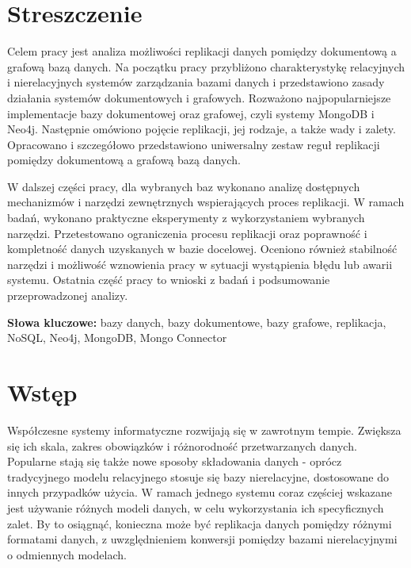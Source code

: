 \documentclass[a4paper,twoside,12pt]{book}
\newcounter{stronyPozaNumeracja}
\begin{document}
\pagestyle{tylkoNumeryStron}
\tableofcontents

\setcounter{stronyPozaNumeracja}{\value{page}}
\mainmatter

\pagestyle{empty}

\chapter*{Streszczenie}

Celem pracy jest analiza możliwości replikacji danych pomiędzy dokumentową a grafową bazą danych. Na początku pracy przybliżono charakterystykę relacyjnych i nierelacyjnych systemów zarządzania bazami danych i przedstawiono zasady działania systemów dokumentowych i grafowych. Rozważono najpopularniejsze implementacje bazy dokumentowej oraz grafowej, czyli systemy MongoDB i Neo4j. Następnie omówiono pojęcie replikacji, jej rodzaje, a także wady i zalety. Opracowano i szczegółowo przedstawiono uniwersalny zestaw reguł replikacji pomiędzy dokumentową a grafową bazą danych.

W dalszej części pracy, dla wybranych baz wykonano analizę dostępnych mechanizmów i narzędzi zewnętrznych wspierających proces replikacji. W ramach badań, wykonano praktyczne eksperymenty z wykorzystaniem wybranych narzędzi. Przetestowano ograniczenia procesu replikacji oraz poprawność i kompletność danych uzyskanych w bazie docelowej. Oceniono również stabilność narzędzi i możliwość wznowienia pracy w sytuacji wystąpienia błędu lub awarii systemu. Ostatnia część pracy to wnioski z badań i podsumowanie przeprowadzonej analizy.

{\bf Słowa kluczowe:} bazy danych, bazy dokumentowe, bazy grafowe, replikacja, NoSQL, Neo4j, MongoDB, Mongo Connector


\cleardoublepage

\pagestyle{NumeryStronNazwyRozdzialow}


\chapter{Wstęp}

Współczesne systemy informatyczne rozwijają się w zawrotnym tempie. Zwiększa się ich skala, zakres obowiązków i różnorodność przetwarzanych danych. Popularne stają się także nowe sposoby składowania danych - oprócz tradycyjnego modelu relacyjnego stosuje się bazy nierelacyjne, dostosowane do innych przypadków użycia. W ramach jednego systemu coraz częściej wskazane jest używanie różnych modeli danych, w celu wykorzystania ich specyficznych zalet. By to osiągnąć, konieczna może być replikacja danych pomiędzy różnymi formatami danych, z uwzględnieniem konwersji pomiędzy bazami nierelacyjnymi o odmiennych modelach.
\end{document}
